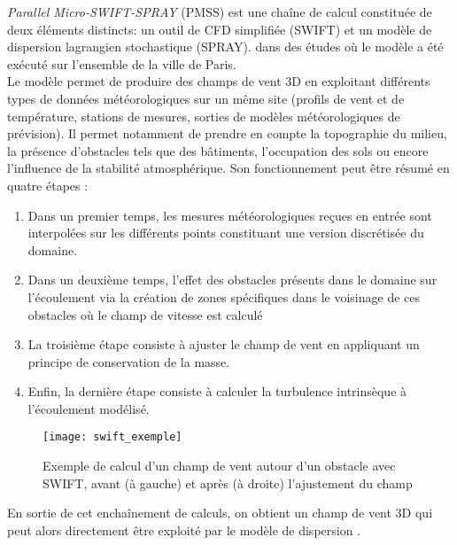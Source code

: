 \textit{Parallel Micro-SWIFT-SPRAY} (PMSS) est une chaîne de calcul constituée de deux éléments distincts: un outil de CFD simplifiée (SWIFT) et un modèle de dispersion lagrangien stochastique (SPRAY).  dans des études \cite{Moussafir2014} où le modèle a été exécuté sur l'ensemble de la ville de Paris.\\

Le modèle  permet de produire des champs de vent 3D en exploitant différents types de données météorologiques sur un même site (profils de vent et de température, stations de mesures, sorties de modèles météorologiques de prévision). Il permet notamment de prendre en compte la topographie du milieu, la présence d'obstacles tels que des bâtiments, l'occupation des sols ou encore l'influence de la stabilité atmosphérique. Son fonctionnement  peut être résumé en quatre étapes :  \\

\begin{enumerate}
	\item Dans un premier temps, les mesures météorologiques reçues en entrée sont interpolées sur les différents points constituant une version discrétisée du domaine.
	\item Dans un deuxième temps, l'effet des obstacles présents dans le domaine sur l'écoulement  via la création de zones spécifiques dans le voisinage de ces obstacles où le champ de vitesse est calculé 
	\item La troisième étape consiste à ajuster le champ de vent en appliquant un principe de conservation de la masse.
	\item Enfin, la dernière étape consiste à calculer la turbulence intrinsèque à l'écoulement modélisé.\\
\end{enumerate}

\begin{figure}[h!]
	\centering
	\texttt{[image: swift\_exemple]}
	\caption{Exemple de calcul d'un champ de vent autour d'un obstacle avec SWIFT, avant (à gauche) et après (à droite) l'ajustement du champ}
	\label{fig_swift_exemple}
\end{figure}
En sortie de cet enchaînement de calculs, on obtient un champ de vent 3D qui peut alors directement être exploité par le modèle de dispersion .


